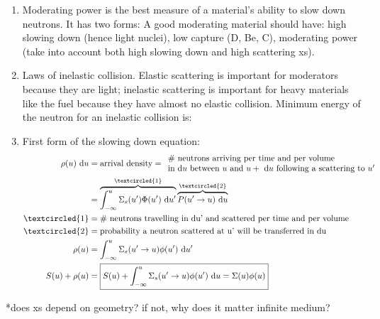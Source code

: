 \documentclass{school-22.211-notes}
\begin{document}
\begin{enumerate}
\item Moderating power is the best measure of a material's ability to slow down neutrons. It has two forms:
A good moderating material should have: high slowing down (hence light nuclei), low capture (D, Be, C), moderating power (take into account both high slowing down and high scattering xs). 

\item Laws of inelastic collision. Elastic scattering is important for moderators because they are light; inelastic scattering is important for heavy materials like the fuel because they have almost no elastic collision. Minimum energy of the neutron for an inelastic collision is:

\item First form of the slowing down equation:
  \begin{align}
    \rho(u) \du 
    &= \mbox{arrival density} = \begin{array}{l}
      \mbox{\# neutrons arriving per time and per volume} \\
      \mbox{in d$u$ between $u$ and $u + \du$ following a scattering to $u'$} 
      \end{array} \\
    &= \overbrace{\int_{-\infty}^u \Sigma_s (u') \Phi(u') \du'}^{\textcircled{1}} \overbrace{ P(u'\to u) \du }^{\textcircled{2}} \\
    \textcircled{1} &= \mbox{\# neutrons travelling in du' and scattered per time and per volume} \\
    \textcircled{2} &= \mbox{probability a neutron scattered at u' will be transferred in du} \\
    \rho(u) &= \int_{-\infty}^u \Sigma_s (u'\to u) \phi(u') \du' \\
    S(u) + \rho(u) &= \boxed{S(u) + \int_{-\infty}^u \Sigma_s (u'\to u) \phi(u') \du  = \Sigma(u) \phi(u) }
  \end{align}
\end{enumerate}



*does xs depend on geometry? if not, why does it matter infinite medium? 

\end{document}
